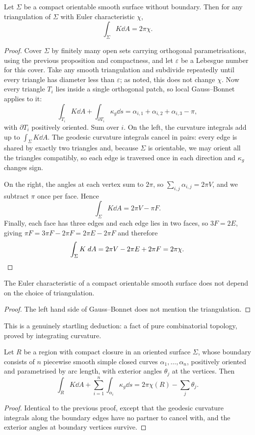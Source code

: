 \documentclass[a4paper]{scrartcl}
\begin{document}
\begin{theorem}
    Let $\Sigma$ be a compact orientable smooth surface without boundary. Then for any triangulation of $\Sigma$ with Euler characteristic $\chi$,
    $$
    \int_\Sigma K \dd A = 2\pi\chi.
    $$
\end{theorem}
\begin{proof}
    Cover $\Sigma$ by finitely many open sets carrying orthogonal parametrisations, using the previous proposition and compactness, and let $\varepsilon$ be a Lebesgue number for this cover. Take any smooth triangulation and subdivide repeatedly until every triangle has diameter less than $\varepsilon$; as noted, this does not change $\chi$. Now every triangle $T_i$ lies inside a single orthogonal patch, so local Gauss--Bonnet applies to it:
    $$
    \int_{T_i} K \dd A + \int_{\partial T_i}\kappa_g \dd s = \alpha_{i,1}+\alpha_{i,2}+\alpha_{i,3} - \pi,
    $$
    with $\partial T_i$ positively oriented. Sum over $i$. On the left, the curvature integrals add up to $\int_\Sigma K \dd A$. The geodesic curvature integrals cancel in pairs: every edge is shared by exactly two triangles and, because $\Sigma$ is orientable, we may orient all the triangles compatibly, so each edge is traversed once in each direction and $\kappa_g$ changes sign.

    On the right, the angles at each vertex sum to $2\pi$, so $\sum_{i,j}\alpha_{i,j} = 2\pi V$, and we subtract $\pi$ once per face. Hence
    $$
    \int_\Sigma K \dd A = 2\pi V - \pi F.
    $$
    Finally, each face has three edges and each edge lies in two faces, so $3F = 2E$, giving $\pi F = 3\pi F - 2\pi F = 2\pi E - 2\pi F$ and therefore
    $$
    \int_\Sigma K \; d A = 2\pi V - 2\pi E + 2\pi F = 2\pi \chi. \qedhere
    $$
\end{proof}

\begin{corollary}
    The Euler characteristic of a compact orientable smooth surface does not depend on the choice of triangulation.
\end{corollary}
\begin{proof}
    The left hand side of Gauss--Bonnet does not mention the triangulation.
\end{proof}

This is a genuinely startling deduction: a fact of pure combinatorial topology, proved by integrating curvature.

\begin{theorem}
    Let $R$ be a region with compact closure in an oriented surface $\Sigma$, whose boundary consists of $n$ piecewise smooth simple closed curves $\alpha_1,\dots,\alpha_n$, positively oriented and parametrised by arc length, with exterior angles $\theta_j$ at the vertices. Then
    $$
    \int_R K \dd A + \sum_{i=1}^n\int_{\alpha_i}\kappa_g \dd s = 2\pi\chi(R) - \sum_j\theta_j.
    $$
\end{theorem}
\begin{proof}
    Identical to the previous proof, except that the geodesic curvature integrals along the boundary edges have no partner to cancel with, and the exterior angles at boundary vertices survive.
\end{proof}
\end{document}

